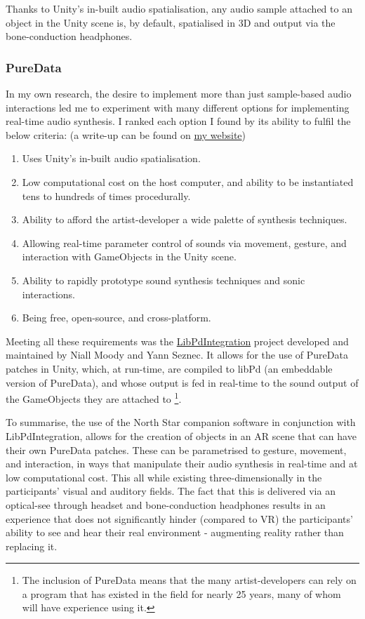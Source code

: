 Thanks to Unity’s in-built audio spatialisation, any audio sample attached to an object in the Unity scene is, by default, spatialised in 3D and output via the bone-conduction headphones.

\subsubsection{PureData}\label{sec: polaris-framework-software-puredata}
In my own research, the desire to implement more than just sample-based audio interactions led me to experiment with many different options for implementing real-time audio synthesis. I ranked each option I found by its ability to fulfil the below criteria: (a write-up can be found on \href{https://sambilbow.com/projects/polaris/software.html}{my website})

\begin{enumerate}
    \item Uses Unity’s in-built audio spatialisation.
    \item Low computational cost on the host computer, and ability to be instantiated tens to hundreds of times procedurally.
    \item Ability to afford the artist-developer a wide palette of synthesis techniques.
    \item Allowing real-time parameter control of sounds via movement, gesture, and interaction with GameObjects in the Unity scene.
    \item Ability to rapidly prototype sound synthesis techniques and sonic interactions.
    \item Being free, open-source, and cross-platform.
\end{enumerate}

Meeting all these requirements was the \href{https://github.com/LibPdIntegration/LibPdIntegration}{LibPdIntegration} project developed and maintained by Niall Moody and Yann Seznec. It allows for the use of PureData patches in Unity, which, at run-time, are compiled to libPd (an embeddable version of PureData), and whose output is fed in real-time to the sound output of the GameObjects they are attached to  \footnote{The inclusion of PureData means that the many artist-developers can rely on a program that has existed in the field for nearly 25 years, many of whom will have experience using it.}.

To summarise, the use of the North Star companion software in conjunction with LibPdIntegration, allows for the creation of objects in an AR scene that can have their own PureData patches. These can be parametrised to gesture, movement, and interaction, in ways that manipulate their audio synthesis in real-time and at low computational cost. This all while existing three-dimensionally in the participants’ visual and auditory fields. The fact that this is delivered via an optical-see through headset and bone-conduction headphones results in an experience that does not significantly hinder (compared to VR) the participants’ ability to see and hear their real environment - augmenting reality rather than replacing it.




